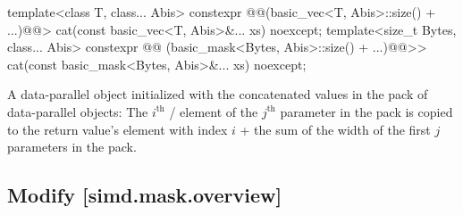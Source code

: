 \begin{wgText}\setcounter{Paras}{5}
\begin{itemdecl}
template<class T, class... Abis>
  constexpr @@(basic_vec<T, Abis>::size() + ...)@@>
    cat(const basic_vec<T, Abis>&... xs) noexcept;
template<size_t Bytes, class... Abis>
  constexpr @@
                            (basic_mask<Bytes, Abis>::size() + ...)@@>>
    cat(const basic_mask<Bytes, Abis>&... xs) noexcept;
\end{itemdecl}

\begin{itemdescr}
\pnumRem
\wgRem{%
\constraints}
\begin{itemize}
\end{itemize}

\pnum
\returns
A data-parallel object initialized with the concatenated values in the
 pack of data-parallel objects: The $i^\text{th}$
/ element of the $j^\text{th}$
parameter in the  pack is copied to the return value's element with
index $i$ + the sum of the width of the first $j$ parameters in the 
pack.
\end{itemdescr}
\end{wgText}

\subsection{Modify [simd.mask.overview]}

